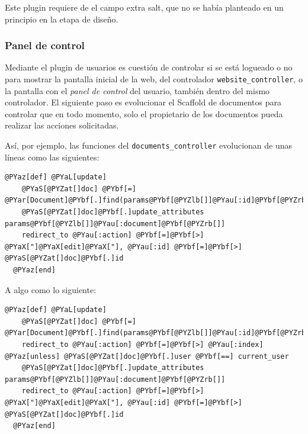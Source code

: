 Este plugin requiere de el campo extra salt, que no se había planteado en un principio en la etapa de diseño.


\subsubsection{Panel de control} %
\label{ssub:panel_de_control}

Mediante el plugin de usuarios es cuestión de controlar si se está logueado o no para mostrar la pantalla inicial de la web, del controlador \texttt{website\_controller}, o la pantalla con el \emph{panel de control} del usuario, también dentro del mismo controlador. El siguiente paso es evolucionar el Scaffold de documentos para controlar que en todo momento, solo el propietario de los documentos pueda realizar las acciones solicitadas.

Así, por ejemplo, las funciones del \texttt{documents\_controller} evolucionan de unas líneas como las siguientes:

\begin{Verbatim}[commandchars=@\[\]]
  @PYaz[def] @PYaL[update]
    @PYaS[@PYZat[]doc] @PYbf[=] @PYar[Document]@PYbf[.]find(params@PYbf[@PYZlb[]]@PYau[:id]@PYbf[@PYZrb[]])
    @PYaS[@PYZat[]doc]@PYbf[.]update_attributes params@PYbf[@PYZlb[]]@PYau[:document]@PYbf[@PYZrb[]]
    redirect_to @PYau[:action] @PYbf[=]@PYbf[>] @PYaX["]@PYaX[edit]@PYaX["], @PYau[:id] @PYbf[=]@PYbf[>] @PYaS[@PYZat[]doc]@PYbf[.]id
  @PYaz[end]
\end{Verbatim}



A algo como lo siguiente:

\begin{Verbatim}[commandchars=@\[\]]
  @PYaz[def] @PYaL[update]
    @PYaS[@PYZat[]doc] @PYbf[=] @PYar[Document]@PYbf[.]find(params@PYbf[@PYZlb[]]@PYau[:id]@PYbf[@PYZrb[]])
    redirect_to @PYau[:action] @PYbf[=]@PYbf[>] @PYau[:index] @PYaz[unless] @PYaS[@PYZat[]doc]@PYbf[.]user @PYbf[==] current_user
    @PYaS[@PYZat[]doc]@PYbf[.]update_attributes params@PYbf[@PYZlb[]]@PYau[:document]@PYbf[@PYZrb[]]
    redirect_to @PYau[:action] @PYbf[=]@PYbf[>] @PYaX["]@PYaX[edit]@PYaX["], @PYau[:id] @PYbf[=]@PYbf[>] @PYaS[@PYZat[]doc]@PYbf[.]id
  @PYaz[end]
\end{Verbatim}


